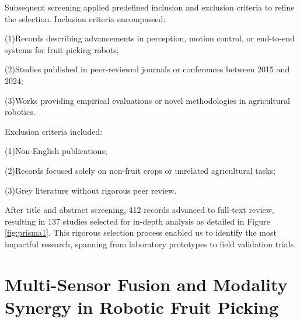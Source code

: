 \documentclass[pdflatex,sn-mathphys-num]{sn-jnl}
\begin{document}
Subsequent screening applied predefined inclusion and exclusion criteria to refine the selection. Inclusion criteria encompassed:

(1)Records describing advancements in perception, motion control, or end-to-end systems for fruit-picking robots;

(2)Studies published in peer-reviewed journals or conferences between 2015 and 2024;

(3)Works providing empirical evaluations or novel methodologies in agricultural robotics.

Exclusion criteria included:

(1)Non-English publications;

(2)Records focused solely on non-fruit crops or unrelated agricultural tasks;

(3)Grey literature without rigorous peer review.

After title and abstract screening, 412 records advanced to full-text review, resulting in 137 studies selected for in-depth analysis as detailed in Figure \ref{fig:prisma1}. This rigorous selection process enabled us to identify the most impactful research, spanning from laboratory prototypes to field validation trials. 



\section{Multi-Sensor Fusion and Modality Synergy in Robotic Fruit Picking}
\end{document}
